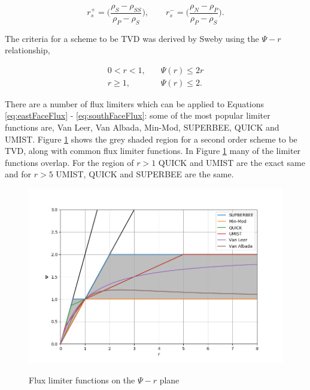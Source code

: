 \begin{equation}
    r_{s}^{+} = \bigg( \frac{\rho_{S} - \rho_{SS}}{\rho_{P} - \rho_{S}}\bigg), \quad \quad r_{s}^{-} = \bigg(\frac{\rho_{N} - \rho_{P}}{\rho_{P} - \rho_{S}} \bigg).
\end{equation}

The criteria for a scheme to be TVD was derived by Sweby \cite{sweby1984} using the $\Psi - r$ relationship,

\begin{equation}
\begin{split}
    0 < r < 1, &\quad \Psi(r) \leq 2r \\
    r \geq 1, &\quad  \Psi (r) \leq 2.
\end{split}
\end{equation}

\noindent There are a number of flux limiters which can be applied to Equations \ref{eq:eastFaceFlux} - \ref{eq:southFaceFlux}: some of the most popular limiter functions are, Van Leer, Van Albada, Min-Mod, SUPERBEE, QUICK and UMIST. Figure \ref{fig:fluxlimiter} shows the grey shaded region for a second order scheme to be TVD, along with common flux limiter functions. In Figure \ref{fig:fluxlimiter} many of the limiter functions overlap. For the region of $r > 1$ QUICK and UMIST are the exact same and for $r > 5$ UMIST, QUICK and SUPERBEE are the same. 


\begin{figure}[htbp]
  \centering
  \includegraphics[width=5.5in]{images/chapter-4/CFLlimiterFunctions.png}\\
  \caption{Flux limiter functions on the $\Psi - r$ plane}
  \label{fig:fluxlimiter}
\end{figure} 

